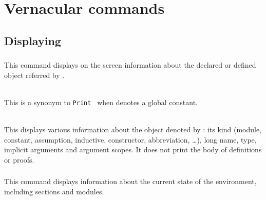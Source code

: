 \chapter[Vernacular commands]{Vernacular commands\label{Vernacular-commands}
\label{Other-commands}}

\section{Displaying}

\subsection[\tt Print {\qualid}.]{}
This command displays on the screen information about the declared or
defined object referred by {\qualid}.

\begin{ErrMsgs}
\item {\qualid} 
\end{ErrMsgs}

\begin{Variants}
\item {}
\\ 
This is a synonym to {\tt Print {\qualid}} when {\qualid} denotes a
global constant. 

\item {}
\label{About}
\\ 
This displays various information about the object denoted by {\qualid}:
its kind (module, constant, assumption, inductive,
constructor, abbreviation, \ldots), long name, type, implicit
arguments and argument scopes. It does not print the body of
definitions or proofs.

\end{Variants}

\subsection[\tt Print All.]{}
This command displays information about the current state of the
environment, including sections and modules.

